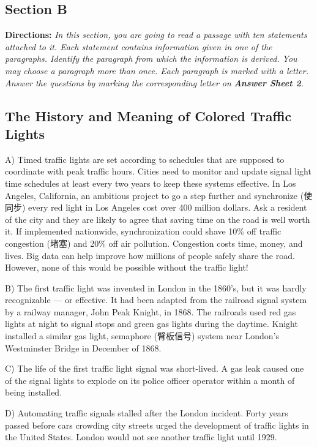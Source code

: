 \documentclass[UTF8,11pt]{ctexart}
\begin{document}
\subsection*{\textbf{Section B}}


\textbf{Directions:} \textit{In this section, you are going to read a passage with ten statements attached to it. Each statement contains} \textit{information given in one of the paragraphs. Identify the paragraph from which the information is derived. You may} \textit{choose a paragraph more than once. Each paragraph is marked with a letter. Answer the questions by marking the} \textit{corresponding letter on }\textbf{\textit{Answer Sheet 2}}\textit{.}


\subsection*{\textbf{The History and Meaning of Colored Traffic Lights}}


A) Timed traffic lights are set according to schedules that are supposed to coordinate with peak traffic hours. Cities need to monitor and update signal light time schedules at least every two years to keep these systems effective. In Los Angeles, California, an ambitious project to go a step further and synchronize (使同步) every red light in Los Angeles cost over 400 million dollars. Ask a resident of the city and they are likely to agree that saving time on the road is well worth it. If implemented nationwide, synchronization could shave 10\% off traffic congestion (堵塞) and 20\% off air pollution. Congestion costs time, money, and lives. Big data can help improve how millions of people safely share the road. However, none of this would be possible without the traffic light!


B) The first traffic light was invented in London in the 1860’s, but it was hardly recognizable — or effective. It had been adapted from the railroad signal system by a railway manager, John Peak Knight, in 1868. The railroads used red gas lights at night to signal stops and green gas lights during the daytime. Knight installed a similar gas light, semaphore (臂板信号) system near London’s Westminster Bridge in December of 1868.


C) The life of the first traffic light signal was short-lived. A gas leak caused one of the signal lights to explode on its police officer operator within a month of being installed.


D) Automating traffic signals stalled after the London incident. Forty years passed before cars crowding city streets urged the development of traffic lights in the United States. London would not see another traffic light until 1929.
\end{document}
